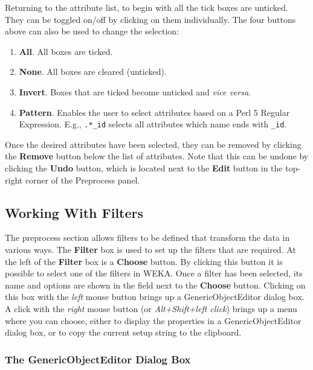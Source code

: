 \documentclass[a4paper]{article}
\begin{document}
Returning to the attribute list, to begin with all the tick boxes are unticked.
They can be toggled on/off by clicking on them individually.  The four buttons
above can also be used to change the selection:

\begin{enumerate}
\item \textbf{All}.
All boxes are ticked.
\item \textbf{None}.
All boxes are cleared (unticked).
\item \textbf{Invert}.
Boxes that are ticked become unticked and {\em vice versa\/}.
\item \textbf{Pattern}.
Enables the user to select attributes based on a Perl 5 Regular Expression. E.g., 
\texttt{.*\_id} selects all attributes which name ends with \texttt{\_id}.
\end{enumerate}

Once the desired attributes have been selected, they can be removed by
clicking the \textbf{Remove} button below the list of attributes.
Note that this can be undone by clicking the \textbf{Undo} button,
which is located next to the \textbf{Edit} button in the top-right
corner of the Preprocess panel.

\subsection{Working With Filters}

\begin{center}
\end{center}

The preprocess section allows filters to be defined that transform the
data in various ways.  The \textbf{Filter} box is used to set up the
filters that are required.  At the left of the \textbf{Filter} box is
a \textbf{Choose} button. By clicking this button it is possible to
select one of the filters in WEKA. Once a filter has been selected,
its name and options are shown in the field next to the
\textbf{Choose} button. Clicking on this box with the \textit{left} mouse button
brings up a GenericObjectEditor dialog box. A click with the \textit{right}
mouse button (or \textit{Alt+Shift+left click}) brings up a menu where you can
choose, either to display the properties in a GenericObjectEditor dialog
box, or to copy the current setup string to the clipboard.

\subsubsection*{The GenericObjectEditor Dialog Box}
\end{document}
